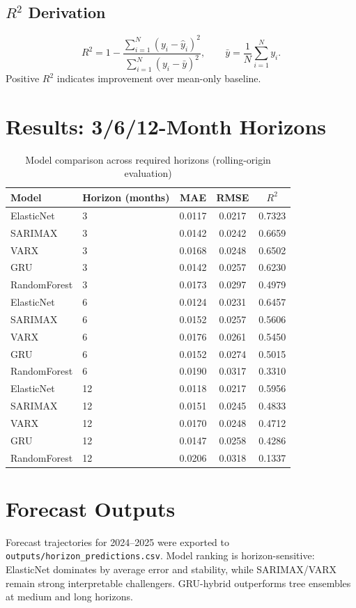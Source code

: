 \documentclass[11pt,a4paper]{article}
\begin{document}
\subsection{\(R^2\) Derivation}
\[
R^2=1-\frac{\sum_{i=1}^{N}(y_i-\hat{y}_i)^2}{\sum_{i=1}^{N}(y_i-\bar{y})^2},
\qquad
\bar{y}=\frac{1}{N}\sum_{i=1}^{N}y_i.
\]
Positive \(R^2\) indicates improvement over mean-only baseline.

\section{Results: 3/6/12-Month Horizons}
\begin{table}[H]
\centering
\caption{Model comparison across required horizons (rolling-origin evaluation)}
\begin{tabular}{llccc}
\toprule
Model & Horizon (months) & MAE & RMSE & \(R^2\) \\
\midrule
ElasticNet & 3 & 0.0117 & 0.0217 & 0.7323 \\
SARIMAX & 3 & 0.0142 & 0.0242 & 0.6659 \\
VARX & 3 & 0.0168 & 0.0248 & 0.6502 \\
GRU & 3 & 0.0142 & 0.0257 & 0.6230 \\
RandomForest & 3 & 0.0173 & 0.0297 & 0.4979 \\
\midrule
ElasticNet & 6 & 0.0124 & 0.0231 & 0.6457 \\
SARIMAX & 6 & 0.0152 & 0.0257 & 0.5606 \\
VARX & 6 & 0.0176 & 0.0261 & 0.5450 \\
GRU & 6 & 0.0152 & 0.0274 & 0.5015 \\
RandomForest & 6 & 0.0190 & 0.0317 & 0.3310 \\
\midrule
ElasticNet & 12 & 0.0118 & 0.0217 & 0.5956 \\
SARIMAX & 12 & 0.0151 & 0.0245 & 0.4833 \\
VARX & 12 & 0.0170 & 0.0248 & 0.4712 \\
GRU & 12 & 0.0147 & 0.0258 & 0.4286 \\
RandomForest & 12 & 0.0206 & 0.0318 & 0.1337 \\
\bottomrule
\end{tabular}
\end{table}

\section{Forecast Outputs}
Forecast trajectories for 2024--2025 were exported to \texttt{outputs/horizon\_predictions.csv}.  
Model ranking is horizon-sensitive: ElasticNet dominates by average error and stability, while SARIMAX/VARX remain strong interpretable challengers. GRU-hybrid outperforms tree ensembles at medium and long horizons.
\end{document}
